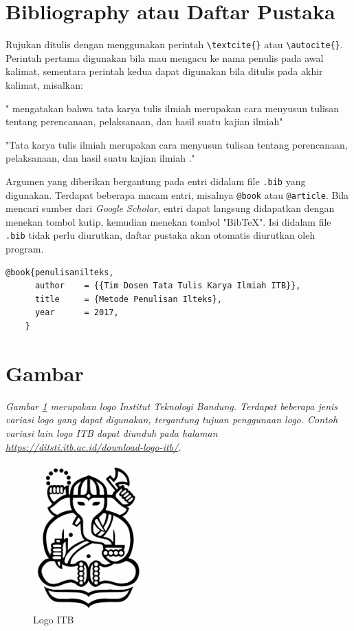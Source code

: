 \section{Bibliography atau Daftar Pustaka}

Rujukan ditulis dengan menggunakan perintah \verb|\textcite{}| atau  \verb|\autocite{}|. Perintah pertama digunakan bila mau mengacu ke nama penulis pada awal kalimat, sementara perintah kedua dapat digunakan bila ditulis pada akhir kalimat, misalkan: 

\begin{displayquote}
    "\textcite{penulisanilteks} mengatakan bahwa tata karya tulis ilmiah merupakan cara menyusun tulisan tentang perencanaan, pelaksanaan, dan hasil suatu kajian ilmiah"
    
    "Tata karya tulis ilmiah merupakan cara menyusun tulisan tentang perencanaan, pelaksanaan, dan hasil suatu kajian ilmiah \autocite{penulisanilteks}."
\end{displayquote}

Argumen yang diberikan bergantung pada entri didalam file \texttt{.bib} yang digunakan. Terdapat beberapa macam entri, misalnya \verb|@book| atau \verb|@article|. Bila mencari sumber dari \textit{Google Scholar}, entri dapat langsung didapatkan dengan menekan tombol kutip, kemudian menekan tombol "BibTeX". Isi didalam file \texttt{.bib} tidak perlu diurutkan, daftar pustaka akan otomatis diurutkan oleh program. 

\begin{lstlisting}[caption={Contoh entri dalam BibTeX}]
    @book{penulisanilteks,
      author    = {{Tim Dosen Tata Tulis Karya Ilmiah ITB}}, 
      title     = {Metode Penulisan Ilteks},
      year      = 2017,
    }
\end{lstlisting}

\section{Gambar}

\textit{Gambar \ref{gambar:logo_itb} merupakan logo Institut Teknologi Bandung. Terdapat beberapa jenis variasi logo yang dapat digunakan, tergantung tujuan penggunaan logo. Contoh variasi lain logo ITB dapat diunduh pada halaman \url{https://ditsti.itb.ac.id/download-logo-itb/}.}

\begin{figure}[H]
    \centering
  	\includegraphics[width=0.38\textwidth]{aset/logo-itb.jpg}
  	\caption{Logo ITB}
  	\label{gambar:logo_itb}
\end{figure}

